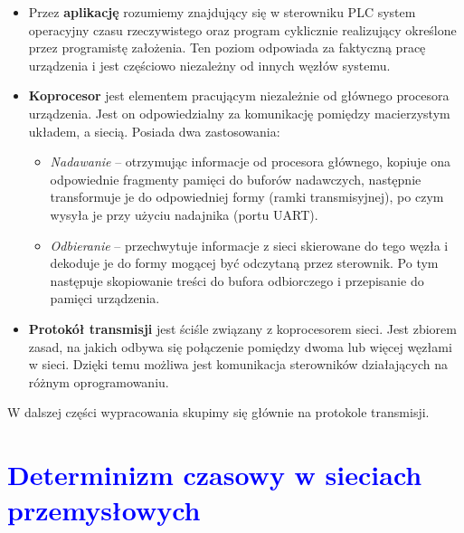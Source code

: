 \documentclass[a4paper,twoside]{article}
\begin{document}
\begin{itemize}
	\item Przez \textbf{aplikację} rozumiemy znajdujący się w sterowniku PLC system operacyjny czasu rzeczywistego oraz program cyklicznie realizujący określone przez programistę założenia. Ten poziom odpowiada za faktyczną pracę urządzenia i jest częściowo niezależny od innych węzłów systemu. \\
	\item \textbf{Koprocesor} jest elementem pracującym niezależnie od głównego procesora urządzenia. Jest on odpowiedzialny za komunikację pomiędzy macierzystym układem, a siecią. Posiada dwa zastosowania: 
	\begin{itemize}
		\item \textit{Nadawanie} – otrzymując informacje od procesora głównego,  kopiuje ona odpowiednie fragmenty pamięci do buforów nadawczych, następnie transformuje je do odpowiedniej formy (ramki transmisyjnej), po czym wysyła je przy użyciu nadajnika (portu UART). \\
		\item \textit{Odbieranie} – przechwytuje informacje z sieci skierowane do tego węzła i dekoduje je do formy mogącej być odczytaną przez sterownik. Po tym następuje skopiowanie treści do bufora odbiorczego i przepisanie do pamięci urządzenia.
	\end{itemize}
	\item \textbf{Protokół transmisji} jest ściśle związany z koprocesorem sieci. Jest zbiorem zasad, na jakich odbywa się połączenie pomiędzy dwoma lub więcej węzłami w sieci. Dzięki temu możliwa jest komunikacja sterowników działających na różnym oprogramowaniu.\\
	
\end{itemize}

W dalszej części wypracowania skupimy się głównie na protokole transmisji.

\section{\textcolor{blue}{Determinizm czasowy w sieciach przemysłowych}}
\end{document}
